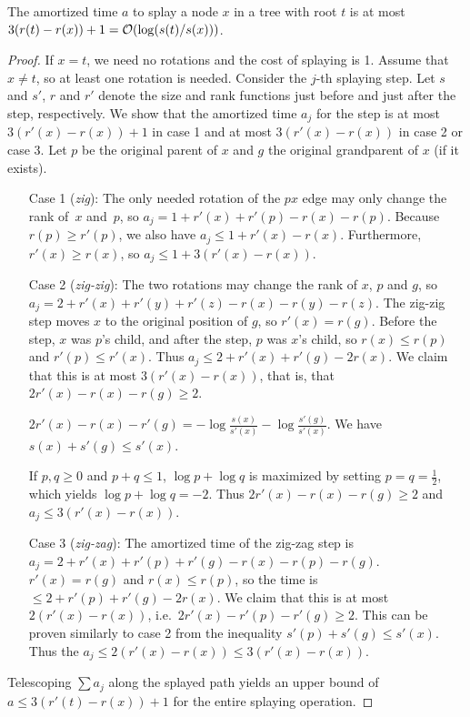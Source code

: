 \begin{lemma}
The amortized time $a$ to splay a node $x$ in a tree with root $t$
is at most $3(r(t)-r(x))+1 = \mathcal{O}(\log(s(t)/s(x)))$.
\end{lemma}
\begin{proof}
If $x=t$, we need no rotations and the cost of splaying is 1.
Assume that  $x\neq t$, so at least one rotation is needed.
Consider the $j$-th splaying step.
Let $s$ and $s'$, $r$ and $r'$ denote the size and rank functions just before
and just after the step, respectively. We show that the amortized time
$a_j$ for the step is at most $3(r'(x)-r(x))+1$ in case 1
and at most $3(r'(x)-r(x))$ in case 2 or case 3. Let $p$ be the original parent
of $x$ and $g$ the original grandparent of $x$ (if it exists).

\begin{itemize}
\item[Case 1 (\emph{zig}):]
	The only needed rotation of the $px$ edge may only change the rank
	of~$x$ and~$p$, so $a_j=1+r'(x)+r'(p)-r(x)-r(p)$.
	Because $r(p)\geq r'(p)$, we also have $a_j\leq 1+r'(x)-r(x)$.
	Furthermore, $r'(x)\geq r(x)$, so $a_j\leq 1+3(r'(x)-r(x))$.

\item[Case 2 (\emph{zig-zig}):]
	The two rotations may change the rank of $x$, $p$ and $g$,
	so $a_j=2+r'(x)+r'(y)+r'(z)-r(x)-r(y)-r(z)$. The zig-zig step
	moves $x$ to the original position of $g$, so $r'(x)=r(g)$.
	Before the step, $x$ was $p$'s child, and after the step,
	$p$ was $x$'s child, so $r(x)\leq r(p)$ and $r'(p)\leq r'(x)$.
	Thus $a_j\leq 2+r'(x)+r'(g)-2r(x)$.
	We claim that this is at most $3(r'(x)-r(x))$, that is, that
	$2r'(x)-r(x)-r(g)\geq 2$.

	$2r'(x)-r(x)-r'(g)=-\log\frac{s(x)}{s'(x)}-\log\frac{s'(g)}{s'(x)}$.
	We have $s(x)+s'(g)\leq s'(x)$.

	If $p,q\geq 0$ and $p+q\leq 1$, $\log p+\log q$ is maximized
	by setting $p=q=\frac{1}{2}$, which yields $\log p+\log q=-2$.
	Thus $2r'(x)-r(x)-r(g)\geq 2$ and $a_j \leq 3(r'(x)-r(x))$.

\item[Case 3 (\emph{zig-zag}):]
	The amortized time of the zig-zag step is
	$a_j=2+r'(x)+r'(p)+r'(g)-r(x)-r(p)-r(g)$. $r'(x)=r(g)$ and $r(x)\leq r(p)$,
	so the time is $\leq 2+r'(p)+r'(g)-2r(x)$.
	We claim that this is at most $2(r'(x)-r(x))$,
	i.e.\ $2r'(x)-r'(p)-r'(g)\geq 2$. This can be proven
	similarly to case 2 from the inequality $s'(p)+s'(g)\leq s'(x)$.
	Thus the $a_j \leq 2(r'(x)-r(x))\leq 3(r'(x)-r(x))$.
\end{itemize}

Telescoping $\sum a_j$ along the splayed path yields an upper bound of
$a \leq 3(r'(t)-r(x))+1$ for the entire splaying operation.
\end{proof}

